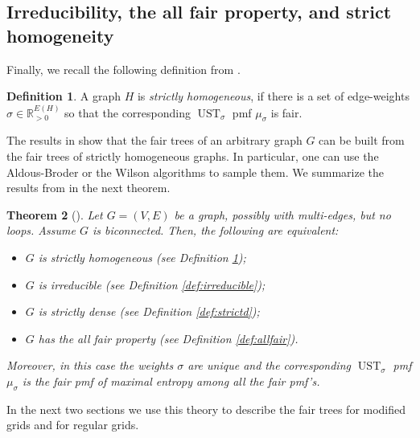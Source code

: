 \documentclass[preprint,12pt]{elsarticle}
\newtheorem{theorem}{Theorem}[section]
\theoremstyle{definition}
\newtheorem{definition}[theorem]{Definition}
\theoremstyle{remark}
\numberwithin{equation}{section}
\newcommand{\R}{\mathbb{R}}
\newcommand{\si}{\sigma }
\newcommand{\UST}{\operatorname{UST}}
\newcommand{\bi}{\begin{itemize}}
\newcommand{\ei}{\end{itemize}}
\begin{document}
\subsection{Irreducibility, the all fair property, and strict homogeneity}
Finally, we recall the following definition from \cite{alpc}.
\begin{definition}\label{def:strictly-homogeneous}
A graph $H$ is {\it strictly homogeneous}, if there is a set of edge-weights $\si\in \R_{>0}^{E(H)}$ so that the corresponding $\UST_\si$ pmf $\mu_\si$ is fair. 
\end{definition}
The results in \cite{alpc} show that the fair trees of an arbitrary graph $G$ can be built from the fair trees of strictly homogeneous graphs. In particular, one can use the Aldous-Broder or the Wilson algorithms to sample them. We summarize the results from \cite{alpc} in the next theorem.
\begin{theorem}[\cite{alpc}]\label{thm:main}
Let $G=(V,E)$ be a graph, possibly  with multi-edges, but no loops. Assume $G$ is biconnected. Then, the following are equivalent:
\bi
\item[(a)] $G$ is strictly homogeneous (see Definition \ref{def:strictly-homogeneous});
\item[(b)] $G$ is irreducible (see Definition \ref{def:irreducible});
\item[(c)] $G$ is strictly dense (see Definition \ref{def:strictd});
\item[(d)] $G$ has the all fair property (see Definition \ref{def:allfair}).
\ei
Moreover, in this case the weights $\si$ are unique and the corresponding $\UST_\si$ pmf $\mu_\si$ is the fair pmf of maximal entropy among all the fair pmf's.
\end{theorem}
In the next two sections we use this theory to describe the fair trees for modified grids and for regular grids.
\end{document}
